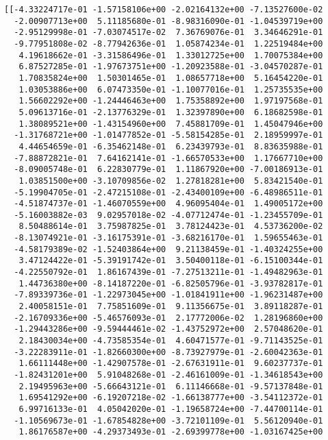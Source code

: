 \documentclass[11pt]{article}
\begin{document}
    \begin{Verbatim}[commandchars=\\\{\}]
[[-4.33224717e-01 -1.57158106e+00 -2.02164132e+00 -7.13527600e-02
  -2.00907713e+00  5.11185680e-01 -8.98316090e-01 -1.04539719e+00
  -2.95129998e-01 -7.03074517e-02  7.36769076e-01  3.34646291e-01
  -9.77951808e-02 -8.77942636e-01  1.05874234e-01  1.22519484e+00
   4.19618662e-01 -3.31586496e-01  1.33012725e+00  1.70075384e+00
   6.87527285e-01 -1.97673751e+00 -1.20923588e-01 -3.04570287e-01
   1.70835824e+00  1.50301465e-01  1.08657718e+00  5.16454220e-01
   1.03053886e+00  6.07473350e-01 -1.10077016e-01  1.25735535e+00
   1.56602292e+00 -1.24446463e+00  1.75358892e+00  1.97197568e-01
   5.09613716e-01 -2.13776329e-01  1.32397890e+00  6.18682598e-01
   1.38089521e+00 -1.43154960e+00  7.45881709e-01  1.45047946e+00
  -1.31768721e+00 -1.01477852e-01 -5.58154285e-01  2.18959997e-01
   4.44654659e-01 -6.35462148e-01  6.23439793e-01  8.83635988e-01
  -7.88872821e-01  7.64162141e-01 -1.66570533e+00  1.17667710e+00
  -8.09005748e-01  6.22830779e-01  1.11867920e+00 -7.00186913e-01
   1.03851500e+00 -3.10709856e-02  1.27818281e+00  5.83421540e-01
  -5.19904705e-01 -2.47215108e-01 -2.43400109e+00 -6.48986511e-01
  -4.51874737e-01 -1.46070559e+00  4.96095404e-01  1.49005172e+00
  -5.16003882e-03  9.02957018e-02 -4.07712474e-01 -1.23455709e-01
   8.50488614e-01  3.75987825e-01  3.78124423e-01  4.53736200e-02
  -8.13074921e-01 -3.16175391e-01 -3.68216170e-01  1.59655463e-01
  -4.58179389e-02 -1.52403864e+00  9.21138459e-01 -1.40324255e+00
   3.47124422e-01 -5.39191742e-01  3.50400118e-01 -6.15100344e-01
  -4.22550792e-01  1.86167439e-01 -7.27513211e-01 -1.49482963e-01
   1.44736380e+00 -8.14187220e-01 -6.82505796e-01 -3.93782817e-01
  -7.89339736e-01 -1.22973045e+00 -1.01841911e+00 -1.96231487e+00
   2.40058151e-01  7.75851609e-01  9.11356675e-01  3.89118287e-01
  -2.16709336e+00 -5.46576093e-01  2.17772006e-02  1.28196860e+00
  -1.29443286e+00 -9.59444461e-02 -1.43752972e+00  2.57048620e-01
   2.18430034e+00 -4.73585354e-01  4.60471577e-01 -9.71143525e-01
  -3.22283911e-01 -1.82660300e+00 -8.73927979e-01 -2.60042363e-01
   1.66111448e+00 -1.42907578e-01 -2.67631911e-01  9.60237737e-01
  -1.82431201e+00  5.91048268e-01 -2.46161009e-01 -1.34618543e+00
   2.19495963e+00 -5.66643121e-01  6.11146668e-01 -9.57137848e-01
   1.69541292e+00 -6.19207218e-02 -1.66138777e+00 -3.54112372e-01
   6.99716133e-01  4.05042020e-01 -1.19658724e+00 -7.44700114e-01
  -1.10569673e-01 -1.67854828e+00 -3.72101109e-01  5.56120940e-01
   1.86176587e+00 -4.29373493e-01 -2.69399778e+00 -1.03167425e+00

\end{Verbatim}
\end{document}
